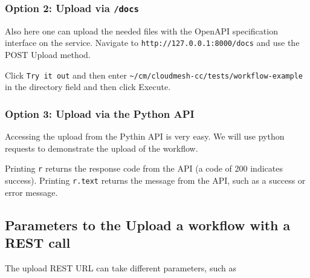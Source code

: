 \hypertarget{option-2-upload-via-docs-1}{%
\subsubsection{\texorpdfstring{Option 2: Upload via
\texttt{/docs}}{Option 2: Upload via /docs}}\label{option-2-upload-via-docs-1}}

Also here one can upload the needed files with the OpenAPI specification
interface on the service. Navigate to
\texttt{http://127.0.0.1:8000/docs} and use the POST Upload method.

Click \texttt{Try\ it\ out} and then enter
\texttt{\textasciitilde{}/cm/cloudmesh-cc/tests/workflow-example} in the
directory field and then click Execute.

\hypertarget{option-3-upload-via-the-python-api-1}{%
\subsubsection{Option 3: Upload via the Python
API}\label{option-3-upload-via-the-python-api-1}}

Accessing the upload from the Pythin API is very easy. We will use
python requests to demonstrate the upload of the workflow.

\begin{Shaded}
\begin{Highlighting}[]

\OperatorTok{=}\NormalTok{)}
\end{Highlighting}
\end{Shaded}

Printing \texttt{r} returns the response code from the API (a code of
200 indicates success). Printing \texttt{r.text} returns the message
from the API, such as a success or error message.

\hypertarget{parameters-to-the-upload-a-workflow-with-a-rest-call}{%
\subsection{Parameters to the Upload a workflow with a REST
call}\label{parameters-to-the-upload-a-workflow-with-a-rest-call}}

The upload REST URL can take different parameters, such as

